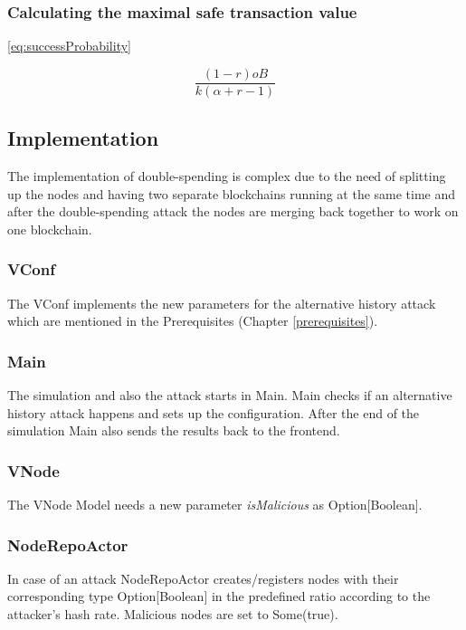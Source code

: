 \subsubsection{Calculating the maximal safe transaction value  \cite{doublespending}}


\eqref{eq:successProbability}

\begin{equation}
\dfrac{(1 - r) oB}{ k  (\alpha + r - 1)}
\end{equation}

\subsection{Implementation}

The implementation of double-spending is complex due to the need of splitting up the nodes and having two separate blockchains running at the same time and after the double-spending attack the nodes are merging back together to work on one blockchain.

\subsubsection{VConf}
The VConf implements the new parameters for the alternative history attack which are mentioned in the Prerequisites (Chapter \ref{prerequisites}).

\subsubsection{Main}
The simulation and also the attack starts in Main. Main checks if an alternative history attack happens and sets up the configuration. After the end of the simulation Main also sends the results back to the frontend.

\subsubsection{VNode}
The VNode Model needs a new parameter \textit{isMalicious} as Option[Boolean].

\subsubsection{NodeRepoActor}
In case of an attack NodeRepoActor creates/registers nodes with their corresponding type Option[Boolean] in the predefined ratio according to the attacker's hash rate. Malicious nodes are set to Some(true).

